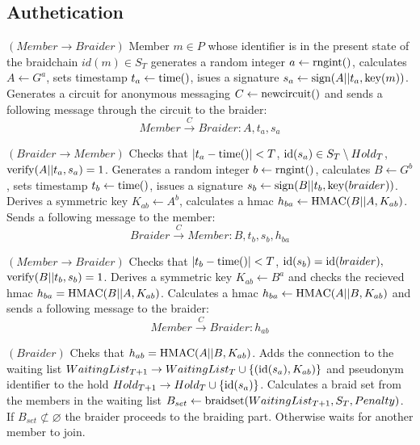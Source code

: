 \documentclass[12pt]{article}
\begin{document}
\subsection*{Authetication}

\begin{steps}
\item $(Member \to Braider)$ Member $m \in P$ whose identifier is in the present state of the braidchain $id(m) \in S_T$ generates a random integer $a \leftarrow {\rm rngint}()$, calculates $A \leftarrow G^a$, sets timestamp $t_a \leftarrow {\rm time}()$, isues a signature $s_a \leftarrow {\rm sign}( A || t_a, {\rm key}(m))$. Generates a circuit for anonymous messaging $C \leftarrow {\rm newcircuit}()$ and sends a following message through the circuit to the braider:
  \begin{equation}
    Member \overset{C}{\to} Braider: A, t_a, s_a  
  \end{equation}

\item $(Braider \to Member)$ Checks that $|t_a - {\rm time}()| < T$, ${\rm id}(s_a) \in S_T \setminus Hold_T$, ${\rm verify}(A||t_a,s_a) = 1$. Generates a random integer $b \leftarrow {\rm rngint}()$, calculates $B \leftarrow G^b$, sets timestamp $t_b \leftarrow {\rm time}()$, issues a signature $s_b \leftarrow  {\rm sign}(B || t_b, {\rm key}(braider))$. Derives a symmetric key $K_{ab} \leftarrow A^b$, calculates a hmac $h_{ba} \leftarrow {\rm HMAC}(B||A,K_{ab})$. Sends a following message to the member:
  \begin{equation}
    Braider \overset{C}{\to} Member: B, t_b, s_b, h_{ba}
  \end{equation}

\item $(Member \to Braider)$ Checks that $|t_b - {\rm time}()| < T$, ${\rm id}(s_b)={\rm id}(braider),$ ${\rm verify}(B||t_b,s_b)=1$. Derives a symmetric key $K_{ab} \leftarrow B^a$ and checks the recieved hmac $h_{ba} = {\rm HMAC}(B||A,K_{ab})$. Calculates a hmac $h_{ba} \leftarrow {\rm HMAC}(A||B,K_{ab})$ and sends a following message to the braider:
  \begin{equation}
    Member \overset{C}{\to} Braider: h_{ab}
  \end{equation}

\item $(Braider)$ Cheks that $h_{ab} = {\rm HMAC}(A||B, K_{ab})$. Adds the connection to the waiting list $WaitingList_{T+1} \to WaitingList_T \cup \left\{ ({\rm id}(s_a), K_{ab}) \right\}$ and pseudonym identifier to the hold $Hold_{T+1} \to Hold_T \cup \{ {\rm id}(s_a)\}$. Calculates a braid set from the members in the waiting list $B_{set} \leftarrow {\rm braidset}(WaitingList_{T+1}, S_T, Penalty)$. If $B_{set}\not\subset \varnothing$ the braider proceeds to the braiding part. Otherwise waits for another member to join.
\end{steps}
\end{document}
